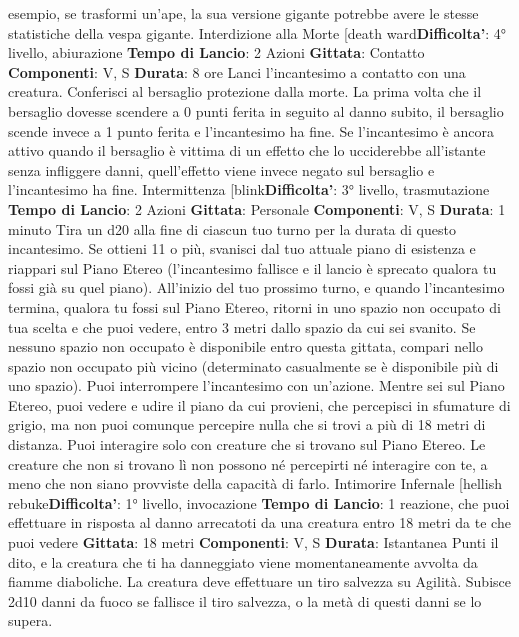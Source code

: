 \begin{multicols}{2}
esempio, se trasformi un’ape, la sua versione gigante
potrebbe avere le stesse statistiche della vespa
gigante.
Interdizione alla Morte
[death ward\textbf{Difficolta'}:
4° livello, abiurazione
\textbf{Tempo di Lancio}: 2 Azioni
\textbf{Gittata}: Contatto
\textbf{Componenti}: V, S
\textbf{Durata}: 8 ore
Lanci l’incantesimo a contatto con una creatura.
Conferisci al bersaglio protezione dalla morte.
La prima volta che il bersaglio dovesse scendere a 0
punti ferita in seguito al danno subito, il bersaglio
scende invece a 1 punto ferita e l’incantesimo ha fine.
Se l’incantesimo è ancora attivo quando il bersaglio è
vittima di un effetto che lo ucciderebbe all’istante senza
infliggere danni, quell’effetto viene invece negato sul
bersaglio e l’incantesimo ha fine.
Intermittenza
[blink\textbf{Difficolta'}:
3° livello, trasmutazione
\textbf{Tempo di Lancio}: 2 Azioni
\textbf{Gittata}: Personale
\textbf{Componenti}: V, S
\textbf{Durata}: 1 minuto
Tira un d20 alla fine di ciascun tuo turno per la durata di
questo incantesimo. Se ottieni 11 o più, svanisci dal tuo
attuale piano di esistenza e riappari sul Piano Etereo
(l’incantesimo fallisce e il lancio è sprecato qualora tu
fossi già su quel piano). All’inizio del tuo prossimo
turno, e quando l’incantesimo termina, qualora tu fossi
sul Piano Etereo, ritorni in uno spazio non occupato di
tua scelta e che puoi vedere, entro 3 metri dallo spazio
da cui sei svanito. Se nessuno spazio non occupato è
disponibile entro questa gittata, compari nello spazio
non occupato più vicino (determinato casualmente se è
disponibile più di uno spazio). Puoi interrompere
l’incantesimo con un’azione.
Mentre sei sul Piano Etereo, puoi vedere e udire il
piano da cui provieni, che percepisci in sfumature di
grigio, ma non puoi comunque percepire nulla che si
trovi a più di 18 metri di distanza. Puoi interagire solo
con creature che si trovano sul Piano Etereo. Le
creature che non si trovano lì non possono né percepirti
né interagire con te, a meno che non siano provviste
della capacità di farlo.
Intimorire Infernale
[hellish rebuke\textbf{Difficolta'}:
1° livello, invocazione
\textbf{Tempo di Lancio}: 1 reazione, che puoi effettuare in
risposta al danno arrecatoti da una creatura entro 18
metri da te che puoi vedere
\textbf{Gittata}: 18 metri
\textbf{Componenti}: V, S
\textbf{Durata}: Istantanea
Punti il dito, e la creatura che ti ha danneggiato viene
momentaneamente avvolta da fiamme diaboliche. La
creatura deve effettuare un tiro salvezza su Agilità.
Subisce 2d10 danni da fuoco se fallisce il tiro salvezza,
o la metà di questi danni se lo supera.

\end{multicols}
